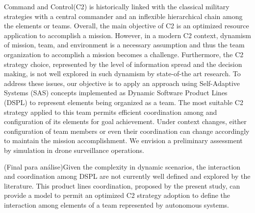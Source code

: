 Command and Control(C2) is historically linked with the classical military strategies with a central commander and an inflexible hierarchical chain among the elements or teams. Overall, the main objective of C2 is an optimized resource application to accomplish a mission. However, in a modern C2 context, dynamism of mission, team, and environment is a necessary assumption and thus the team organization to accomplish a mission becomes a challenge. Furthermore, the C2 strategy choice, represented by the level of information spread and the decision making, is not well explored in such dynamism by state-of-the art research. To address these issues, our objective is to apply an approach using Self-Adaptive Systems (SAS) concepts implemented as Dynamic Software Product Lines (DSPL) to represent elements being organized as a team. The most suitable C2 strategy applied to this team permits efficient coordination among and configuration of its elements for goal achievement. Under context changes, either configuration of team members or even their coordination can change accordingly to maintain the mission accomplishment. We envision a preliminary assessment by simulation in drone surveillance operations.


(Final para análise)Given the complexity in dynamic scenarios, the interaction and coordination among DSPL are not currently well defined and explored by the literature. This product lines coordination, proposed by the present study, can provide a model to permit an optimized C2 strategy adoption to define the interaction among elements of a team represented by autonomous systems.
